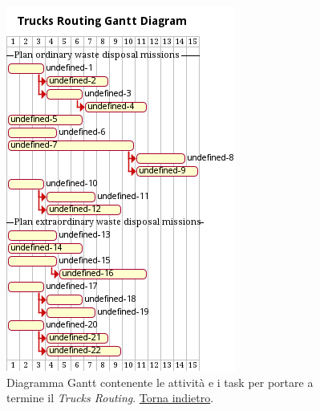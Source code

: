 \begin{figure}[H]
    \centering
    \includegraphics[width=\textwidth]{uml/gantt-trucks-routing.pm}
    \caption{Diagramma Gantt contenente le attività e i task per portare a termine il \textit{Trucks Routing}. \hyperlink{back:uml/gantt-trucks-routing}{Torna indietro}.}
    \label{fig:uml/gantt-trucks-routing}
\end{figure}


